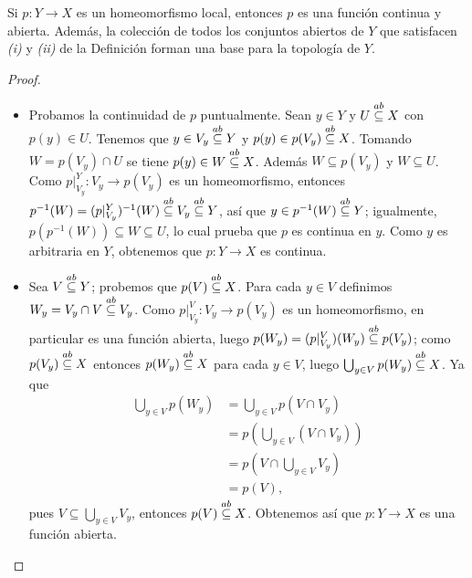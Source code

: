 \begin{Prop}
   Si $p:Y\to X$ es un homeomorfismo local, entonces $p$ es una función continua y abierta. Además, la colección de todos los conjuntos abiertos de $Y$ que satisfacen \textit{(i)} y \textit{(ii)} de la Definición  forman una base para la topología de $Y$.
\end{Prop}
\begin{proof}
   \begin{itemize}
      \item Probamos la continuidad de $p$ puntualmente. Sean $y\in Y$ y $U\stackrel{ab}{\subseteq} X$ con $p(y)\in U$. Tenemos que $y\in V_y\stackrel{ab}{\subseteq} Y$ y $p(y)\in p(V_y)\stackrel{ab}{\subseteq} X$. Tomando $W=p(V_y)\cap U$ se tiene $p(y)\in W\stackrel{ab}{\subseteq} X$. Además $W\subseteq p(V_y)$ y $W\subseteq U$. Como $p|^{Y}_{V_y}:V_y\to p(V_y)$ es un homeomorfismo, entonces $p^{-1}(W)=(p|^{Y}_{V_y})^{-1}(W)\stackrel{ab}{\subseteq} V_y \stackrel{ab}{\subseteq} Y$, así que $y\in p^{-1}(W)\stackrel{ab}{\subseteq} Y$; igualmente, $p(p^{-1}(W))\subseteq W \subseteq U$, lo cual prueba que $p$ es continua en $y$. Como $y$ es arbitraria en $Y$, obtenemos que $p:Y\to X$ es continua.
      \item Sea $V\stackrel{ab}{\subseteq} Y$; probemos que $p(V)\stackrel{ab}{\subseteq} X$. Para cada $y\in V$ definimos $W_y=V_y\cap V\stackrel{ab}{\subseteq} V_y$. Como $p|^{V}_{V_y}:V_y\to p(V_y)$ es un homeomorfismo, en particular es una función abierta, luego $p(W_y)=(p|^{V}_{V_y})(W_y)\stackrel{ab}{\subseteq} p(V_y)$; como $p(V_y)\stackrel{ab}{\subseteq} X$ entonces $p(W_y)\stackrel{ab}{\subseteq} X$ para cada $y\in V$, luego $\bigcup_{y\in V} p(W_y)\stackrel{ab}{\subseteq} X$. Ya que
         $$
         \begin{aligned}
            \bigcup_{y\in V}p(W_y)&=\bigcup_{y\in V}p(V\cap V_y)\\
                                  &=p\left( \bigcup_{y\in V}(V\cap V_y)\right)\\
                                  &=p\left( V\cap\bigcup_{y\in V}V_y\right)\\
                                  &=p(V),
         \end{aligned}
         $$
         pues $V\subseteq \bigcup_{y\in V}V_y$, entonces $p(V)\stackrel{ab}{\subseteq} X$. Obtenemos así que $p:Y\to X$ es una función abierta.
   \end{itemize}
\end{proof}
